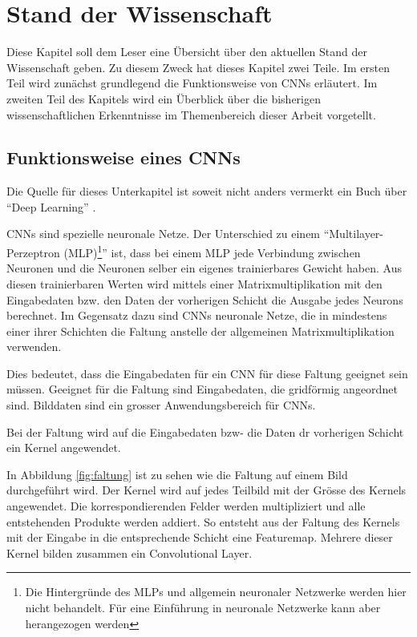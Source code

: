 \chapter{Stand der Wissenschaft}
Diese Kapitel soll dem Leser eine Übersicht über den aktuellen Stand der Wissenschaft geben. Zu diesem Zweck hat dieses Kapitel zwei Teile. Im ersten Teil wird zunächst grundlegend die Funktionsweise von CNNs erläutert. Im zweiten Teil des Kapitels wird ein Überblick über die bisherigen wissenschaftlichen Erkenntnisse im Themenbereich dieser Arbeit vorgetellt.
\section{Funktionsweise eines CNNs}\label{sec:conv}
Die Quelle für dieses Unterkapitel ist soweit nicht anders vermerkt ein Buch über \enquote{Deep Learning} \cite{CNNBook}.

CNNs sind spezielle neuronale Netze. Der Unterschied zu einem \enquote{Multilayer-Perzeptron (MLP)\footnote{Die Hintergründe des MLPs und allgemein neuronaler Netzwerke werden hier nicht behandelt. Für eine Einführung in neuronale Netzwerke kann aber \cite{neural} herangezogen werden}} ist, dass bei einem MLP jede Verbindung zwischen Neuronen und die Neuronen selber ein eigenes trainierbares Gewicht haben. Aus diesen trainierbaren Werten wird mittels einer Matrixmultiplikation mit den Eingabedaten bzw. den Daten der vorherigen Schicht die Ausgabe jedes Neurons berechnet.
Im Gegensatz dazu sind CNNs neuronale Netze, die in mindestens einer ihrer Schichten die Faltung anstelle der allgemeinen Matrixmultiplikation verwenden.


Dies bedeutet, dass die Eingabedaten für ein CNN für diese Faltung geeignet sein müssen. Geeignet für die Faltung sind Eingabedaten, die gridförmig angeordnet sind. Bilddaten sind ein grosser Anwendungsbereich für CNNs.

Bei der Faltung wird auf die Eingabedaten bzw- die Daten dr vorherigen Schicht ein Kernel angewendet.

In Abbildung \ref{fig:faltung} ist zu sehen wie die Faltung auf einem Bild durchgeführt wird. Der Kernel wird auf jedes Teilbild mit der Grösse des Kernels angewendet. Die korrespondierenden Felder werden multipliziert und alle entstehenden Produkte werden addiert. So entsteht aus der Faltung des Kernels mit der Eingabe in die entsprechende Schicht eine Featuremap.
Mehrere dieser Kernel bilden zusammen ein Convolutional Layer. 

